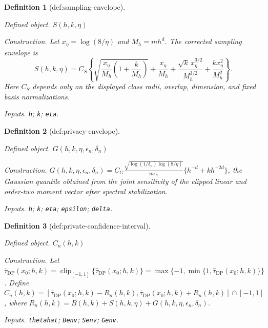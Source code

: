 \documentclass{article}
\newtheorem{definition}{Definition}
\begin{document}
\begin{definition}[def:sampling-envelope]\label{def:sampling-envelope}
\par\smallskip\noindent\emph{Defined object.} \(S(h,k,\eta)\)
\par\smallskip\noindent\emph{Construction.} Let \(x_\eta=\log(8/\eta)\) and \(M_h=mh^d\).  The corrected sampling envelope is
\[
 S(h,k,\eta)=C_S\left\{
 \sqrt{\frac{x_\eta}{M_h}\left(1+\frac{k}{M_h}\right)}
 +\frac{x_\eta}{M_h}
 +\frac{\sqrt{k}\,x_\eta^{3/2}}{M_h^{3/2}}
 +\frac{kx_\eta^2}{M_h^2}
 \right\}.
\]
Here \(C_S\) depends only on the displayed class radii, overlap, dimension, and fixed basis normalizations.
\par\smallskip\noindent\emph{Inputs.} \texttt{h}; \texttt{k}; \texttt{eta}.
\end{definition}

\begin{definition}[def:privacy-envelope]\label{def:privacy-envelope}
\par\smallskip\noindent\emph{Defined object.} \(G(h,k,\eta,\epsilon_n,\delta_n)\)
\par\smallskip\noindent\emph{Construction.} \(G(h,k,\eta,\epsilon_n,\delta_n)=C_G\frac{\sqrt{\log(1/\delta_n)\log(8/\eta)}}{m\epsilon_n}\{h^{-d}+k h^{-2d}\}\), the Gaussian quantile obtained from the joint sensitivity of the clipped linear and order-two moment vector after spectral stabilization.
\par\smallskip\noindent\emph{Inputs.} \texttt{h}; \texttt{k}; \texttt{eta}; \texttt{epsilon}; \texttt{delta}.
\end{definition}

\begin{definition}[def:private-confidence-interval]\label{def:private-confidence-interval}
\par\smallskip\noindent\emph{Defined object.} \(C_n(h,k)\)
\par\smallskip\noindent\emph{Construction.} Let \(\bar\tau_{\mathrm{DP}}(x_0;h,k)=\operatorname{clip}_{[-1,1]}\{\widehat\tau_{\mathrm{DP}}(x_0;h,k)\}=\max\{-1,\min\{1,\widehat\tau_{\mathrm{DP}}(x_0;h,k)\}\}\).  Define \(C_n(h,k)=[\bar\tau_{\mathrm{DP}}(x_0;h,k)-R_n(h,k),\bar\tau_{\mathrm{DP}}(x_0;h,k)+R_n(h,k)]\cap[-1,1]\), where \(R_n(h,k)=B(h,k)+S(h,k,\eta)+G(h,k,\eta,\epsilon_n,\delta_n)\).
\par\smallskip\noindent\emph{Inputs.} \texttt{thetahat}; \texttt{Benv}; \texttt{Senv}; \texttt{Genv}.
\end{definition}
\end{document}
